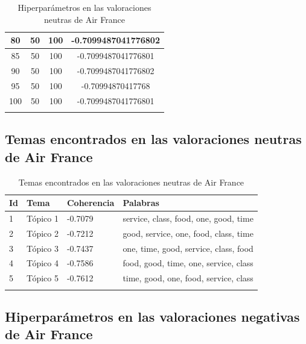 \documentclass{report}
\begin{document}
{\begin{longtable}{|c|c|c|c|}
                    \hline
                    80 & 50 & 100 & -0.7099487041776802 \\
                    \hline
                    85 & 50 & 100 & -0.7099487041776801 \\
                    \hline
                    90 & 50 & 100 & -0.7099487041776802 \\
                    \hline
                    95 & 50 & 100 & -0.70994870417768 \\
                    \hline
                    100 & 50 & 100 & -0.7099487041776801 \\
                    \hline
                    \caption{Hiperparámetros en las valoraciones neutras de Air France}
                \end{longtable}
            \clearpage\subsection{Temas encontrados en las valoraciones neutras de Air France}
                \label{tab:temas_air_france_neutras}
                \begin{longtable}{|p{1cm}|p{4cm}|p{4cm}|p{6cm}|}
                    \hline
                    \textbf{Id} & \textbf{Tema} & \textbf{Coherencia} & \textbf{Palabras} \\
                    \hline
                    1 & Tópico 1 & -0.7079 & service, class, food, one, good, time \\
                    \hline
                    2 & Tópico 2 & -0.7212 & good, service, one, food, class, time \\
                    \hline
                    3 & Tópico 3 & -0.7437 & one, time, good, service, class, food \\
                    \hline
                    4 & Tópico 4 & -0.7586 & food, good, time, one, service, class \\
                    \hline
                    5 & Tópico 5 & -0.7612 & time, good, one, food, service, class \\
                    \hline
                    \caption{Temas encontrados en las valoraciones neutras de Air France}
                \end{longtable}
            \clearpage\subsection{Hiperparámetros en las valoraciones negativas de Air France}
                \label{tab:hiperparametros_air_france_negativas}
}
\end{document}
